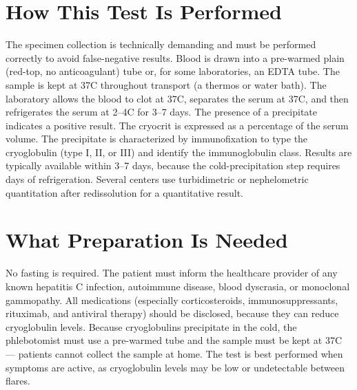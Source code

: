 \section*{How This Test Is Performed}
The specimen collection is technically demanding and must be performed correctly to avoid false-negative results. Blood is drawn into a pre-warmed plain (red-top, no anticoagulant) tube or, for some laboratories, an EDTA tube. The sample is kept at 37\textdegree{}C throughout transport (a thermos or water bath). The laboratory allows the blood to clot at 37\textdegree{}C, separates the serum at 37\textdegree{}C, and then refrigerates the serum at 2--4\textdegree{}C for 3--7 days. The presence of a precipitate indicates a positive result. The cryocrit is expressed as a percentage of the serum volume. The precipitate is characterized by immunofixation to type the cryoglobulin (type I, II, or III) and identify the immunoglobulin class. Results are typically available within 3--7 days, because the cold-precipitation step requires days of refrigeration. Several centers use turbidimetric or nephelometric quantitation after redissolution for a quantitative result.

\section*{What Preparation Is Needed}
No fasting is required. The patient must inform the healthcare provider of any known hepatitis C infection, autoimmune disease, blood dyscrasia, or monoclonal gammopathy. All medications (especially corticosteroids, immunosuppressants, rituximab, and antiviral therapy) should be disclosed, because they can reduce cryoglobulin levels. Because cryoglobulins precipitate in the cold, the phlebotomist must use a pre-warmed tube and the sample must be kept at 37\textdegree{}C --- patients cannot collect the sample at home. The test is best performed when symptoms are active, as cryoglobulin levels may be low or undetectable between flares.

